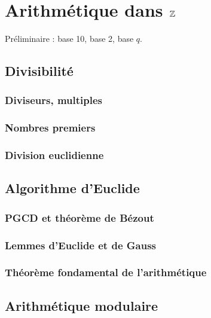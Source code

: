 
\chapter{Arithmétique dans $\mathbb{Z}$}
\label{chap:1}

Préliminaire : base 10, base 2, base $q$.

\section{Divisibilité}

\subsection{Diviseurs, multiples}

\subsection{Nombres premiers}

\subsection{Division euclidienne}

\section{Algorithme d'Euclide}

\subsection{PGCD et théorème de Bézout}


\subsection{Lemmes d'Euclide et de Gauss}

\subsection{Théorème fondamental de l'arithmétique}

\section{Arithmétique modulaire}

